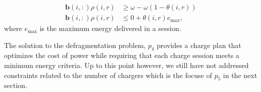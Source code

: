 \begin{equation}\label{eqn:defragmentation:fragmented}\begin{aligned}
	\mathbf{b}(i,:)\rho(i,r) &\ge \omega - \omega(1 - \theta(i,r)) \\
	\mathbf{b}(i,:)\rho(i,r) &\le 0 + \theta(i,r)e_{\text{max}},
\end{aligned}\end{equation}
where $e_{\text{max}}$ is the maximum energy delivered in a session. 
\par The solution to the defragmentation problem, $p_4$ provides a charge plan that optimizes the cost of power while requiring that each charge session meets a minimum energy criteria. Up to this point however, we still have not addressed constraints  related to the number of chargers which is the focuse of $p_5$ in the next section.
\\[0.1in] 


